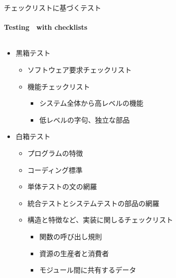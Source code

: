 
\begin{frame}[shrink=15]{チェックリストに基づくテスト}
\framesubtitle{Testing　with checklists}
\begin{columns}[t]
    \begin{column}{.6\textwidth}
    \begin{itemize}
    \item 黒箱テスト
        \begin{itemize}
        \item ソフトウェア要求チェックリスト
        \item 機能チェックリスト
            \begin{itemize}
            \item システム全体から高レベルの機能
            \item 低レベルの字句、独立な部品
            \end{itemize}
        \end{itemize}
    \item 白箱テスト
        \begin{itemize}
        \item プログラムの特徴
        \item コーディング標準
        \item 単体テストの文の網羅
        \item 統合テストとシステムテストの部品の網羅
        \item 構造と特徴など、実装に関しるチェックリスト
            \begin{itemize}
            \item 関数の呼び出し規則
            \item 資源の生産者と消費者
            \item モジュール間に共有するデータ
            \end{itemize}
        \end{itemize}
    \end{itemize}
    \end{column}
        \begin{column}{.35\textwidth}
        \begin{figure}

\end{figure}
\end{column}
\end{columns}
\end{frame}
